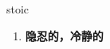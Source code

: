 
\begin{frame}
{\huge stoic}
\begin{center}
\begin{enumerate}\Large
  \item \textbf{隐忍的，冷静的}
\end{enumerate}
\end{center}
\end{frame}
